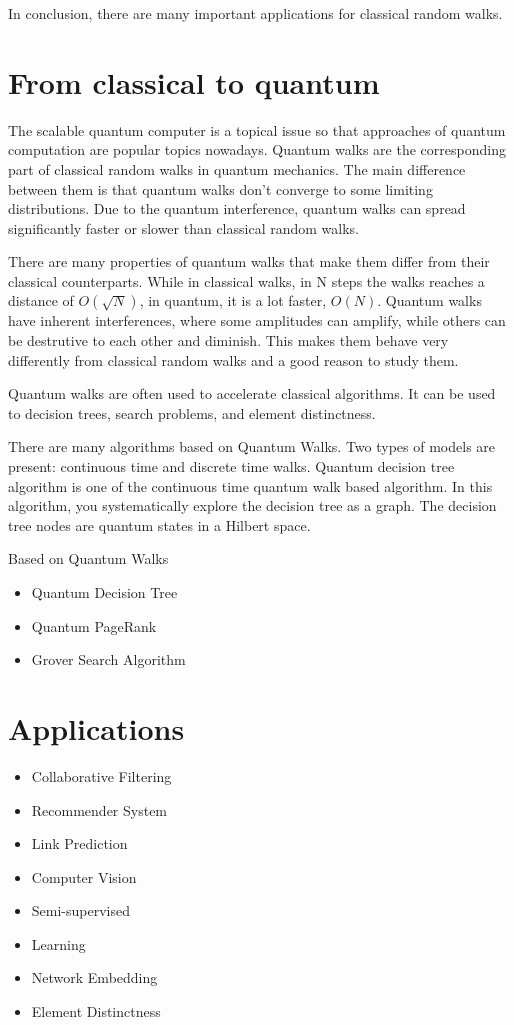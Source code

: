 In conclusion, there are many important applications for classical random walks.

\section{From classical to quantum}

The scalable quantum computer is a topical issue so that approaches of quantum computation are popular topics nowadays. Quantum walks are the corresponding part of classical random walks in quantum mechanics. The main difference between them is that quantum walks don’t converge to some limiting distributions. Due to the quantum interference, quantum walks can spread significantly faster or slower than classical random walks. 

There are many properties of quantum walks that make them differ from their classical counterparts. While in classical walks, in N steps the walks reaches a distance of $O(\sqrt{N})$, in quantum, it is a lot faster, $O(N)$. Quantum walks have inherent interferences, where some amplitudes can amplify, while others can be destrutive to each other and diminish. This makes them behave very differently from classical random walks and a good reason to study them.

Quantum walks are often used to accelerate classical algorithms. It can be used to decision trees, search problems, and element distinctness.

There are many algorithms based on Quantum Walks. Two types of models are present: continuous time and discrete time walks. Quantum decision tree algorithm is one of the continuous time quantum walk based algorithm. In this algorithm, you systematically explore the decision tree as a graph. The decision tree nodes are quantum states in a Hilbert space. 

Based on Quantum Walks
\begin{itemize}
\item Quantum Decision Tree
\item Quantum PageRank
\item Grover Search Algorithm
\end{itemize}

\section{Applications}
\begin{itemize}
\item Collaborative Filtering
\item Recommender System
\item Link Prediction
\item Computer Vision
\item Semi-supervised
\item Learning
\item Network Embedding
\item Element Distinctness
\end{itemize}

